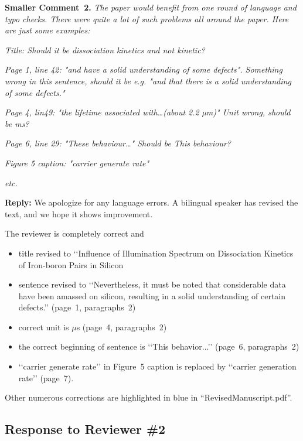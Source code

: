 \documentclass{WileyMSP-template}
\begin{document}
\vspace{1cm}
\noindent
\textcolor[rgb]{0.00,0.50,1.00}{\textbf{Smaller Comment~2.}}
\emph{The paper would benefit from one round of language and typo checks.
There were quite a lot of such problems all around the paper.
Here are just some examples:}

\emph{Title: Should it be dissociation kinetics and not kinetic?}

\emph{Page 1, line 42:
"and have a solid understanding of some defects".
Something wrong in this sentence,
should it be e.g. "and that there is a solid understanding of some defects."}

\emph{
Page 4, lin49: "the lifetime associated with…(about 2.2 µm)" Unit wrong, should be ms?}

\emph{
Page 6, line 29: "These behaviour…" Should be This behaviour?}

\emph{
Figure 5 caption: "carrier generate rate"}

\emph{
etc.}

\noindent
\textcolor[rgb]{0.51,0.00,0.00}{\textbf{Reply:}}
We apologize for any language errors.
A bilingual speaker has revised the text, and we hope it shows improvement.

The reviewer is completely correct and
\begin{itemize}
  \item title revised to ‘‘Influence of Illumination Spectrum on Dissociation Kinetics of Iron-boron Pairs in Silicon
  \item sentence revised to ‘‘Nevertheless, it must be noted that considerable data have been amassed on silicon, resulting in a solid understanding of certain defects.’’
  (page~1, paragraphs~2)
  \item correct unit is $\mu$s (page~4, paragraphs~2)
  \item the correct beginning of sentence is ‘‘This behavior...’’ (page~6, paragraphs~2)
  \item ‘‘carrier generate rate’’ in Figure~5 caption is replaced by ‘‘carrier generation rate’’ (page~7).
\end{itemize}

Other numerous corrections are highlighted in blue in ``RevisedManuscript.pdf''.



\vspace{1cm}
\subsection*{Response to Reviewer \#2 }
\end{document}
